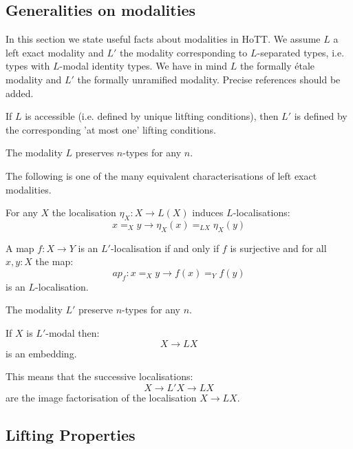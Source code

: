 \subsection{Generalities on modalities}

In this section we state useful facts about modalities in HoTT. We assume $L$ a left exact modality and $L'$ the modality corresponding to $L$-separated types, i.e. types with $L$-modal identity types. We have in mind $L$ the formally étale modality and $L'$ the formally unramified modality. Precise references should be added.

\begin{lemma}
If $L$ is accessible (i.e. defined by unique litfting conditions), then $L'$ is defined by the corresponding 'at most one' lifting conditions.
\end{lemma}

\begin{lemma}
The modality $L$ preserves $n$-types for any $n$.
\end{lemma}

The following is one of the many equivalent characterisations of left exact modalities.

\begin{lemma}
For any $X$ the localisation $\eta_X:X\to L(X)$ induces $L$-localisations:
\[x=_Xy \to \eta_X(x)=_{LX}\eta_X(y)\]
\end{lemma}

\begin{proposition}
\label{separatedLocalisationIsQuotient}
A map $f:X\to Y$ is an $L'$-localisation if and only if $f$ is surjective and for all $x,y:X$ the map:
\[ap_f : x=_Xy\to f(x)=_Yf(y)\] 
is an $L$-localisation.
\end{proposition}

\begin{corollary}
The modality $L'$ preserve $n$-types for any $n$.
\end{corollary}

\begin{corollary}
If $X$ is $L'$-modal then:
\[X\to LX\]
is an embedding.
\end{corollary}

This means that the successive localisations:
\[X\to L'X\to LX\]
are the image factorisation of the localisation $X\to LX$.

\subsection{Lifting Properties}

